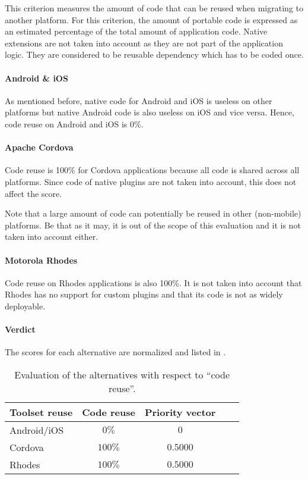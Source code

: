 This criterion measures the amount of code that can be reused when migrating to another platform. For this criterion, the amount of portable code is expressed as an estimated percentage of the total amount of application code. Native extensions are not taken into account as they are not part of the application logic. They are considered to be reusable dependency which has to be coded once. 

\paragraph{Android \& iOS} As mentioned before, native code for Android and iOS is useless on other platforms but native Android code is also useless on iOS and vice versa. Hence, code reuse on Android and iOS is 0\%.

\paragraph{Apache Cordova} Code reuse is 100\% for Cordova applications because all code is shared across all platforms. Since code of native plugins are not taken into account, this does not affect the score.

Note that a large amount of code can potentially be reused in other (non-mobile) platforms. Be that as it may, it is out of the scope of this evaluation and it is not taken into account either.

\paragraph{Motorola Rhodes} Code reuse on Rhodes applications is also 100\%. It is not taken into account that Rhodes has no support for custom plugins and that its code is not as widely deployable.

\paragraph{Verdict} The scores for each alternative are normalized and listed in . 

\begin{table}[h!]
    \begin{center}
        \begin{tabular}{lcccl}
            \hline
            \textbf{Toolset reuse} & Code reuse & Priority vector \\
            \hline
            Android/iOS            & $0\%$       & $0$            \\
            Cordova                & $100\%$     & $0.5000$       \\
            Rhodes                 & $100\%$     & $0.5000$       \\
            \hline
        \end{tabular}
        \caption{Evaluation of the alternatives with respect to ``code reuse''.}
        \label{tab:cr}
    \end{center}
\end{table}


